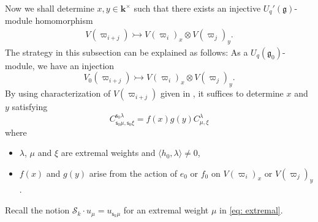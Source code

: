 \documentclass[11pt, leqno]{amsart}
\theoremstyle{definition}
\numberwithin{equation}{section}
\begin{document}
Now we shall
determine $x,y \in {\mathbf{k}}^\times$ such that there exists an injective $U_q'({\mathfrak g})$-module homomorphism
\begin{align} \label{eq:coeff x,y}
 V({\varpi}_{i+j}) \rightarrowtail V({\varpi}_{i})_x \otimes V({\varpi}_{j})_y.
 \end{align}
 The strategy in this subsection can be explained as follows:
As a $U_q({\mathfrak g}_0)$-module, we have an injection
$$V_0({\varpi}_{i+j}) \rightarrowtail V({\varpi}_{i})_{x} \otimes V({\varpi}_{j})_{y}.$$
By using characterization of $V({\varpi}_{i+j})$ given in \cite[$\S$ 1.3]{AK}, it suffices to determine $x$ and $y$ satisfying
$$ C^{{\mathsf{s}}_0 \lambda}_{{\mathsf{s}}_0 \mu,{\mathsf{s}}_0 \xi} = f(x)g(y) C^{\lambda}_{\mu,\xi}$$
where
\begin{itemize}
\item $\lambda$, $\mu$ and $\xi$ are extremal weights and $\langle h_0,\lambda \rangle \ne 0$,
\item $f(x)$ and $g(y)$ arise from the action of $e_0$ or $f_0$ on $V({\varpi}_i)_x$ or $V({\varpi}_j)_y$.
\end{itemize}
\medskip

Recall the notion $\mathcal{S}_k \cdot u_{\mu}=u_{{\mathsf{s}}_k\mu}$ for an extremal weight $\mu$ in \eqref{eq: extremal}.
\end{document}
